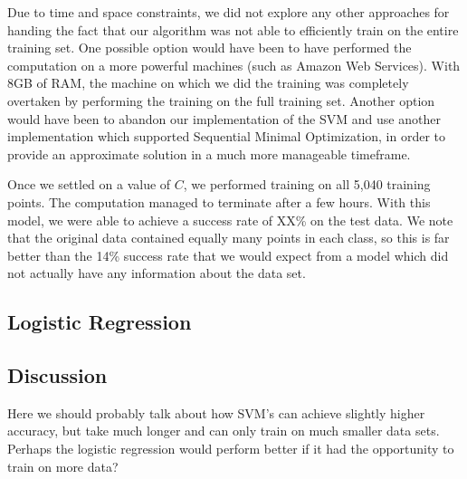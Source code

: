 \documentclass{sigchi}
\begin{document}
Due to time and space constraints, we did not explore any other approaches for handing the fact that our algorithm was not able to efficiently train on the entire training set. One possible option would have been to have performed the computation on a more powerful machines (such as Amazon Web Services). With 8GB of RAM, the machine on which we did the training was completely overtaken by performing the training on the full training set. Another option would have been to abandon our implementation of the SVM and use another implementation which supported Sequential Minimal Optimization, in order to provide an approximate solution in a much more manageable timeframe.

Once we settled on a value of $C$, we performed training on all 5,040 training points. The computation managed to terminate after a few hours. With this model, we were able to achieve a success rate of XX\% on the test data. We note that the original data contained equally many points in each class, so this is far better than the 14\% success rate that we would expect from a model which did not actually have any information about the data set.

\subsection{Logistic Regression}

\subsection{Discussion}

Here we should probably talk about how SVM's can achieve slightly higher accuracy, but take much longer and can only train on much smaller data sets. Perhaps the logistic regression would perform better if it had the opportunity to train on more data?
\end{document}
